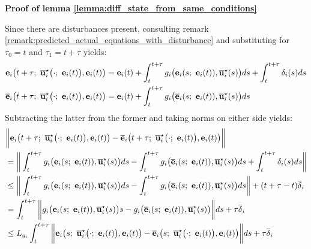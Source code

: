 \begin{gg_box}
\textbf{Proof of lemma \eqref{lemma:diff_state_from_same_conditions}}

Since there are disturbances present, consulting remark
\eqref{remark:predicted_actual_equations_with_disturbance} and substituting
for $\tau_0 = t$ and $\tau_1 = t + \tau$ yields:
\begin{align}
  \vect{e}_i\big(t + \tau;\ \overline{\vect{u}}_i^{\star}\big(\cdot;\ \vect{e}_i(t)\big), \vect{e}_i(t)\big) &=
    \vect{e}_i(t)
    + \int_{t}^{t + \tau} g_i\big(\vect{e}_i(s;\ \vect{e}_i(t)), \overline{\vect{u}}_i^{\star}(s)\big) ds
    + \int_{t}^{t + \tau}\delta_i(s)ds\\
  \overline{\vect{e}}_i\big(t + \tau;\ \overline{\vect{u}}_i^{\star}\big(\cdot;\ \vect{e}_i(t)\big), \vect{e}_i(t)\big) &=
    \vect{e}_i(t) + \int_{t}^{t + \tau} g_i\big(\overline{\vect{e}}_i(s;\ \vect{e}_i(t)), \overline{\vect{u}}_i^{\star}(s)\big) ds
\end{align}
Subtracting the latter from the former and taking norms on either side yields:
\begin{align}
  &\bigg\| \vect{e}_i\big(t + \tau;\ \overline{\vect{u}}_i^{\star}\big(\cdot;\ \vect{e}_i(t)\big), \vect{e}_i(t)\big) -
  \overline{\vect{e}}_i\big(t + \tau;\ \overline{\vect{u}}_i^{\star}\big(\cdot;\ \vect{e}_i(t)\big), \vect{e}_i(t)\big) \bigg\| \\
  &=\bigg\| \int_{t}^{t + \tau} g_i\big(\vect{e}_i(s;\ \vect{e}_i(t)), \overline{\vect{u}}_i^{\star}(s)\big) ds
     - \int_{t}^{t + \tau} g_i\big(\overline{\vect{e}}_i(s;\ \vect{e}_i(t)), \overline{\vect{u}}_i^{\star}(s)\big) ds
    + \int_{t}^{t + \tau}\delta_i(s)ds \bigg\| \\
  & \leq \bigg\| \int_{t}^{t + \tau} g_i\big(\vect{e}_i(s;\ \vect{e}_i(t)), \overline{\vect{u}}_i^{\star}(s)\big) ds
     - \int_{t}^{t + \tau} g_i\big(\overline{\vect{e}}_i(s;\ \vect{e}_i(t)), \overline{\vect{u}}_i^{\star}(s)\big) ds \bigg\|
     + (t + \tau - t)\overline{\delta}_i \\
  &=
     \int_{t}^{t + \tau} \bigg\| g_i\big(\vect{e}_i(s;\ \vect{e}_i(t)), \overline{\vect{u}}_i^{\star}(s)\big)s
     - g_i\big(\overline{\vect{e}}_i(s;\ \vect{e}_i(t)), \overline{\vect{u}}_i^{\star}(s)\big) \bigg\| ds + \tau \overline{\delta}_i\\
  &\leq L_{g_i} \int_{t}^{t + \tau} \bigg\| \vect{e}_i\big(s;\ \overline{\vect{u}}_i^{\star}\big(\cdot;\ \vect{e}_i(t)\big), \vect{e}_i(t)\big) -
  \overline{\vect{e}}_i\big(s;\ \overline{\vect{u}}_i^{\star}\big(\cdot;\ \vect{e}_i(t)\big), \vect{e}_i(t)\big) \bigg\| ds + \tau \overline{\delta}_i  \\

\end{align}
\end{gg_box}
